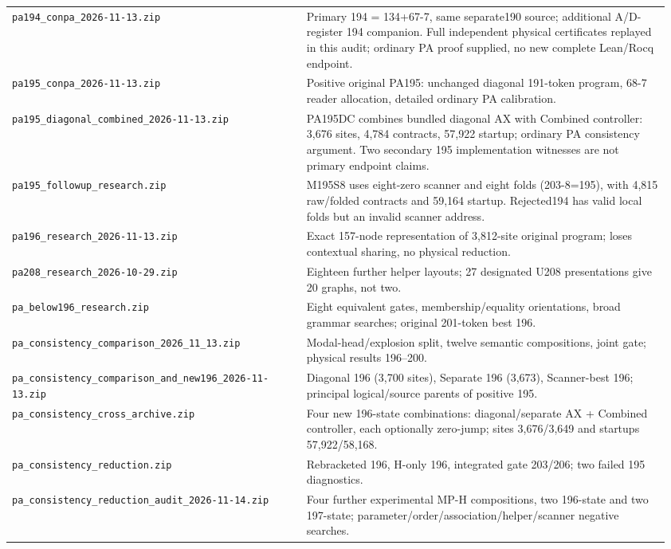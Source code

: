 \begin{longtable}{@{}>{\raggedright\arraybackslash}p{0.43\linewidth}>{\raggedright\arraybackslash}p{0.53\linewidth}@{}}
\nolinkurl{pa194_conpa_2026-11-13.zip} & Primary 194 = 134+67-7, same separate190 source; additional A/D-register 194 companion. Full independent physical certificates replayed in this audit; ordinary PA proof supplied, no new complete Lean/Rocq endpoint.\\[4pt]
\nolinkurl{pa195_conpa_2026-11-13.zip} & Positive original PA195: unchanged diagonal 191-token program, 68-7 reader allocation, detailed ordinary PA calibration.\\[4pt]
\nolinkurl{pa195_diagonal_combined_2026-11-13.zip} & PA195DC combines bundled diagonal AX with Combined controller: 3,676 sites, 4,784 contracts, 57,922 startup; ordinary PA consistency argument. Two secondary 195 implementation witnesses are not primary endpoint claims.\\[4pt]
\nolinkurl{pa195_followup_research.zip} & M195S8 uses eight-zero scanner and eight folds (203-8=195), with 4,815 raw/folded contracts and 59,164 startup. Rejected194 has valid local folds but an invalid scanner address.\\[4pt]
\nolinkurl{pa196_research_2026-11-13.zip} & Exact 157-node representation of 3,812-site original program; loses contextual sharing, no physical reduction.\\[4pt]
\nolinkurl{pa208_research_2026-10-29.zip} & Eighteen further helper layouts; 27 designated U208 presentations give 20 graphs, not two.\\[4pt]
\nolinkurl{pa_below196_research.zip} & Eight equivalent gates, membership/equality orientations, broad grammar searches; original 201-token best 196.\\[4pt]
\nolinkurl{pa_consistency_comparison_2026_11_13.zip} & Modal-head/explosion split, twelve semantic compositions, joint gate; physical results 196--200.\\[4pt]
\nolinkurl{pa_consistency_comparison_and_new196_2026-11-13.zip} & Diagonal 196 (3,700 sites), Separate 196 (3,673), Scanner-best 196; principal logical/source parents of positive 195.\\[4pt]
\nolinkurl{pa_consistency_cross_archive.zip} & Four new 196-state combinations: diagonal/separate AX + Combined controller, each optionally zero-jump; sites 3,676/3,649 and startups 57,922/58,168.\\[4pt]
\nolinkurl{pa_consistency_reduction.zip} & Rebracketed 196, H-only 196, integrated gate 203/206; two failed 195 diagnostics.\\[4pt]
\nolinkurl{pa_consistency_reduction_audit_2026-11-14.zip} & Four further experimental MP-H compositions, two 196-state and two 197-state; parameter/order/association/helper/scanner negative searches.\\[4pt]

\end{longtable}

